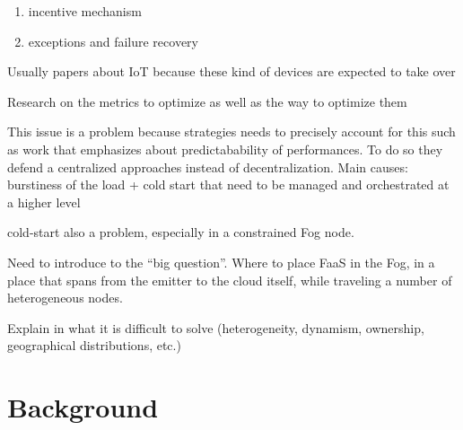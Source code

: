 \documentclass[11pt]{sdm}
\begin{document}
\begin{itemize}
{{\begin{enumerate}
		      \item incentive mechanism
		      \item exceptions and failure recovery
	      \end{enumerate}
	      }
	\item Usually papers about IoT because these kind of devices are expected to take over
	\item Research on the metrics to optimize as well as the way to optimize them
	\item This issue is a problem because strategies needs to precisely account for this such as  work that emphasizes about predictabability of performances. To do so they defend a centralized approaches instead of decentralization. Main causes: burstiness of the load + cold start that need to be managed and orchestrated at a higher level
	\item cold-start also a problem, especially in a constrained Fog node.
	\item Need to introduce to the ``big question''. Where to place \gls{FaaS} in the Fog, in a place that spans from the emitter to the cloud itself, while traveling a number of heterogeneous nodes.
	\item Explain in what it is difficult to solve (heterogeneity, dynamism, ownership, geographical distributions, etc.)
	      }


\end{itemize}

\section{Background}
\end{document}
